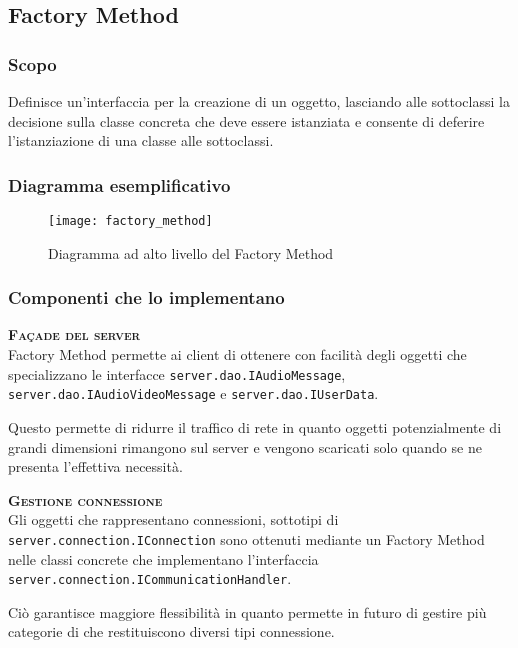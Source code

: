 \subsection{Factory Method}

\subsubsection{Scopo}
Definisce un'interfaccia per la creazione di un oggetto, lasciando alle sottoclassi la decisione sulla classe concreta che deve essere istanziata e consente di deferire l'istanziazione di una classe alle sottoclassi.

\subsubsection{Diagramma esemplificativo}
\begin{figure}[H]
\centering
\texttt{[image: factory\_method]}
\caption{Diagramma ad alto livello del  Factory Method}\label{fig:factory_method}
\end{figure}

\subsubsection{Componenti che lo implementano}
\begin{description}
  \item{\scshape\bfseries Façade del server}\\
Factory Method permette ai client di ottenere con facilità degli oggetti  che specializzano le interfacce \texttt{server.dao.IAudioMessage}, \texttt{server.dao.IAudioVideoMessage} e \texttt{server.dao.IUserData}.

Questo permette di ridurre il traffico di rete in quanto oggetti potenzialmente di grandi dimensioni rimangono sul server e vengono scaricati solo quando se ne presenta l'effettiva necessità.
  \item{\scshape\bfseries Gestione connessione}\\
Gli oggetti che rappresentano connessioni, sottotipi di \texttt{server.connection.IConnection} sono ottenuti mediante un Factory Method nelle classi concrete che implementano l'interfaccia \texttt{server.connection.ICommunicationHandler}.

Ciò garantisce maggiore flessibilità in quanto permette in futuro di gestire più categorie di  che restituiscono diversi tipi connessione.
\end{description}

